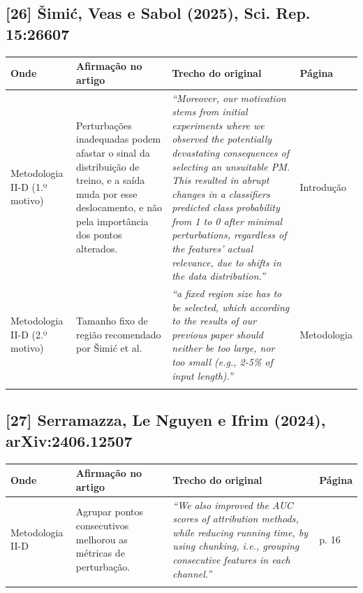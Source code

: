\documentclass[11pt,a4paper]{article}
\begin{document}
\subsection*{[26] Šimić, Veas e Sabol (2025), Sci. Rep. 15:26607}
\begin{longtable}{>{\raggedright\arraybackslash}p{2.6cm}>{\raggedright\arraybackslash}p{4.6cm}>{\raggedright\arraybackslash}p{7.6cm}>{\raggedright\arraybackslash}p{1.4cm}}
\toprule
\textbf{Onde} & \textbf{Afirmação no artigo} & \textbf{Trecho do original} & \textbf{Página} \\
\midrule
Metodologia II-D (1.º motivo) & Perturbações inadequadas podem afastar o sinal da distribuição de treino, e a saída muda por esse deslocamento, e não pela importância dos pontos alterados. & \textit{``Moreover, our motivation stems from initial experiments where we observed the potentially devastating consequences of selecting an unsuitable PM. This resulted in abrupt changes in a classifiers predicted class probability from 1 to 0 after minimal perturbations, regardless of the features' actual relevance, due to shifts in the data distribution.''} & Introdução \\
\addlinespace
Metodologia II-D (2.º motivo) & Tamanho fixo de região recomendado por Šimić et al. & \textit{``a fixed region size has to be selected, which according to the results of our previous paper should neither be too large, nor too small (e.g., 2-5\% of input length).''} & Metodologia \\
\addlinespace
\bottomrule
\end{longtable}
\subsection*{[27] Serramazza, Le Nguyen e Ifrim (2024), arXiv:2406.12507}
\begin{longtable}{>{\raggedright\arraybackslash}p{2.6cm}>{\raggedright\arraybackslash}p{4.6cm}>{\raggedright\arraybackslash}p{7.6cm}>{\raggedright\arraybackslash}p{1.4cm}}
\toprule
\textbf{Onde} & \textbf{Afirmação no artigo} & \textbf{Trecho do original} & \textbf{Página} \\
\midrule
Metodologia II-D & Agrupar pontos consecutivos melhorou as métricas de perturbação. & \textit{``We also improved the AUC scores of attribution methods, while reducing running time, by using chunking, i.e., grouping consecutive features in each channel.''} & p. 16 \\
\addlinespace
\bottomrule
\end{longtable}
\end{document}
